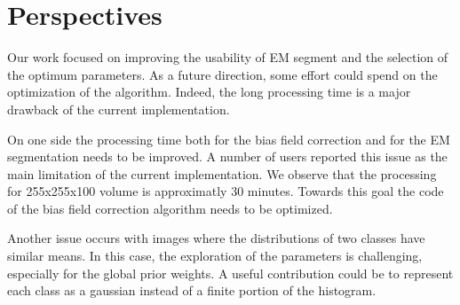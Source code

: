 \section{Perspectives}
Our work focused on improving the usability of EM segment and the selection of the optimum parameters. As a future direction, some effort could spend on the optimization of the algorithm. Indeed, the long processing time is a major drawback of the current implementation.
\par
On one side the processing time both for the bias field correction and for the EM segmentation needs to be improved. A number of users reported this issue as the main limitation of the current implementation. We observe that the processing for 255x255x100 volume is approximatly 30 minutes. Towards this goal the code of the bias field correction algorithm needs to be optimized.
\par
Another issue occurs with images where the distributions of two classes have similar means. In this case, the exploration of the parameters is challenging, especially for the global prior weights. A useful contribution could be to represent each class as a gaussian instead of a finite portion of the histogram.


